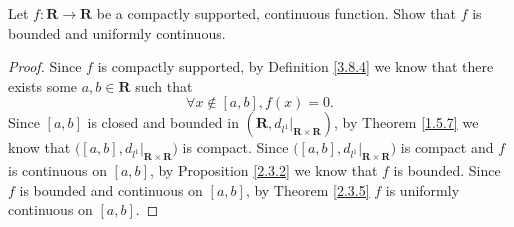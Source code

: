 \begin{exercise}\label{ex 3.8.3}
    Let \(f : \mathbf{R} \to \mathbf{R}\) be a compactly supported, continuous function.
    Show that \(f\) is bounded and uniformly continuous.
\end{exercise}

\begin{proof}
    Since \(f\) is compactly supported, by Definition \ref{3.8.4} we know that there exists some \(a, b \in \mathbf{R}\) such that
    \[
        \forall x \notin [a, b], f(x) = 0.
    \]
    Since \([a, b]\) is closed and bounded in \((\mathbf{R}, d_{l^1}|_{\mathbf{R} \times \mathbf{R}})\), by Theorem \ref{1.5.7} we know that \(\big([a, b], d_{l^1}|_{\mathbf{R} \times \mathbf{R}}\big)\) is compact.
    Since \(\big([a, b], d_{l^1}|_{\mathbf{R} \times \mathbf{R}}\big)\) is compact and \(f\) is continuous on \([a, b]\), by Proposition \ref{2.3.2} we know that \(f\) is bounded.
    Since \(f\) is bounded and continuous on \([a, b]\), by Theorem \ref{2.3.5} \(f\) is uniformly continuous on \([a, b]\).


\end{proof}
